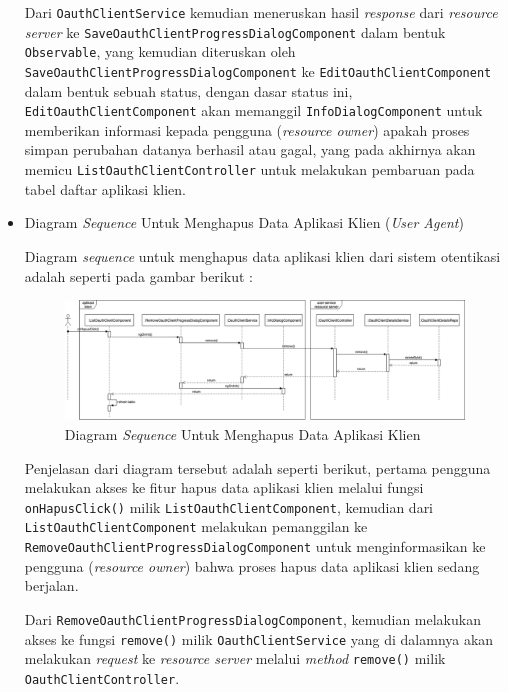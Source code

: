 \documentclass[pdftex,12pt, oneside]{article}
\begin{document}
\begin{itemize}
	Dari \texttt{OauthClientService} kemudian meneruskan hasil \textit{response} dari \textit{resource server} ke \texttt{SaveOauthClientProgressDialogComponent} dalam bentuk \texttt{Observable}, yang kemudian diteruskan oleh \texttt{SaveOauthClientProgressDialogComponent} ke \texttt{EditOauthClientComponent} dalam bentuk sebuah status, dengan dasar status ini, \texttt{EditOauthClientComponent} akan memanggil \texttt{InfoDialogComponent} untuk memberikan informasi kepada pengguna (\textit{resource owner}) apakah proses simpan perubahan datanya berhasil atau gagal, yang pada akhirnya akan memicu \texttt{ListOauthClientController} untuk melakukan pembaruan pada tabel daftar aplikasi klien.
	
	\item Diagram \textit{Sequence} Untuk Menghapus Data Aplikasi Klien (\textit{User Agent})
	
	Diagram \textit{sequence} untuk menghapus data aplikasi klien dari sistem otentikasi adalah seperti pada gambar berikut :
	
	\begin{figure}[H]
		\centering
		\includegraphics[width=1\textwidth]{./resources/seq-del-client}
		\caption{Diagram \textit{Sequence} Untuk Menghapus Data Aplikasi Klien}
		\label{fig:seq-del-client}
	\end{figure}
	
	Penjelasan dari diagram tersebut adalah seperti berikut, pertama pengguna melakukan akses ke fitur hapus data aplikasi klien melalui fungsi \texttt{onHapusClick()} milik \texttt{ListOauthClientComponent}, kemudian dari \texttt{ListOauthClientComponent} melakukan pemanggilan ke \texttt{RemoveOauthClientProgressDialogComponent} untuk menginformasikan ke pengguna (\textit{resource owner}) bahwa proses hapus data aplikasi klien sedang berjalan.
	
	Dari \texttt{RemoveOauthClientProgressDialogComponent}, kemudian melakukan akses ke fungsi \texttt{remove()} milik \texttt{OauthClientService} yang di dalamnya akan melakukan \textit{request} ke \textit{resource server} melalui \textit{method} \texttt{remove()} milik \texttt{OauthClientController}.
	

\end{itemize}
\end{document}
